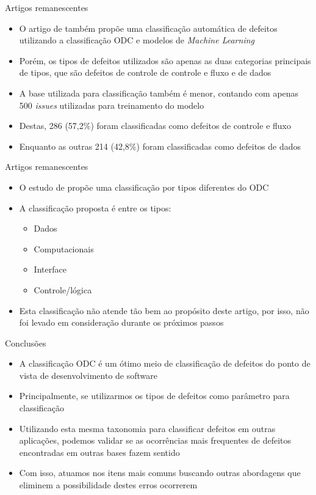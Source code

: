 \documentclass[brazilian]{beamer}
\begin{document}
\begin{frame}{Artigos remanescentes}
    \begin{itemize}
        \item O artigo de \cite{automatic_defect_categorization} também propõe uma classificação automática de defeitos utilizando a classificação ODC e modelos de \emph{Machine Learning}
        \item Porém, os tipos de defeitos utilizados são apenas as duas categorias principais de tipos, que são defeitos de controle de controle e fluxo e de dados
        \item A base utilizada para classificação também é menor, contando com apenas 500 \textit{issues} utilizadas para treinamento do modelo
        \item Destas, 286 (57,2\%) foram classificadas como defeitos de controle e fluxo
        \item Enquanto as outras 214 (42,8\%) foram classificadas como defeitos de dados 
    \end{itemize}
\end{frame}

\begin{frame}{Artigos remanescentes}
    \begin{itemize}
        \item O estudo de \cite{ast_based_aproach_to_classifying_defects} propõe uma classificação por tipos diferentes do ODC
        \item A classificação proposta é entre os tipos:
        \begin{itemize}
            \item Dados
            \item Computacionais
            \item Interface
            \item Controle/lógica
        \end{itemize}
        \item Esta classificação não atende tão bem ao propósito deste artigo, por isso, não foi levado em consideração durante os próximos passos
    \end{itemize}
\end{frame}

\begin{frame}{Conclusões}
    \begin{itemize}
        \item A classificação ODC é um ótimo meio de classificação de defeitos do ponto de vista de desenvolvimento de software
        \item Principalmente, se utilizarmos os tipos de defeitos como parâmetro para classificação
        \item Utilizando esta mesma taxonomia para classificar defeitos em outras aplicações, podemos validar se as ocorrências mais frequentes de defeitos encontradas em outras bases fazem sentido
        \item Com isso, atuamos nos itens mais comuns buscando outras abordagens que eliminem a possibilidade destes erros ocorrerem
    \end{itemize}
\end{frame}
\end{document}
